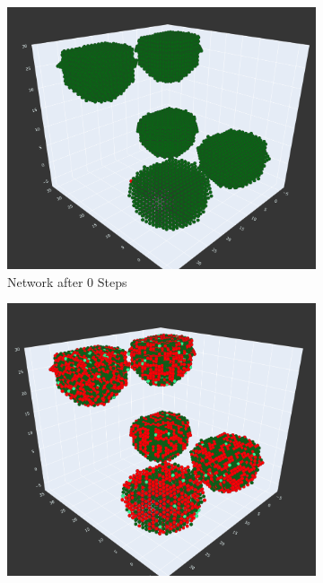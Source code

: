 \begin{figure}
    \centering
    \begin{subfigure}[b]{0.475\textwidth}
        \centering
        \includegraphics[width=\textwidth]{images/oscillation0.png}
        \caption[Network2]%
        {{\small Network after 0 Steps}}    
        \label{fig:mean and std of net14}
    \end{subfigure}
    \hfill
    \begin{subfigure}[b]{0.475\textwidth}  
        \centering 
        \includegraphics[width=\textwidth]{images/oscillation12.png}

\end{subfigure}
\end{figure}
